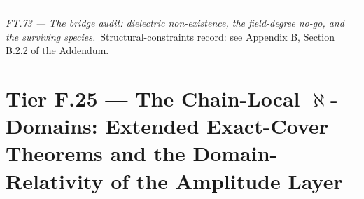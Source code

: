 \begin{theorem}
\vspace{2pt}\noindent\rule{\textwidth}{0.4pt}\vspace{2pt}

\end{theorem}

\medskip\noindent\textit{\texorpdfstring{FT.73 — The bridge audit: dielectric non-existence, the field-degree no-go, and the surviving species}{FT.73 - The bridge audit: dielectric non-existence, the field-degree no-go, and the surviving species}.}\ Structural-constraints record: see Appendix B, Section B.2.2 of the Addendum.\par\medskip

\section[Tier F.25 — The Chain-Local -Domains: Extended Exact-Cover…]{\texorpdfstring{Tier F.25 — The Chain-Local $\aleph$-Domains: Extended Exact-Cover Theorems and the Domain-Relativity of the Amplitude Layer}{Tier F.25 - The Chain-Local -Domains: Extended Exact-Cover Theorems and the Domain-Relativity of the Amplitude Layer}}

